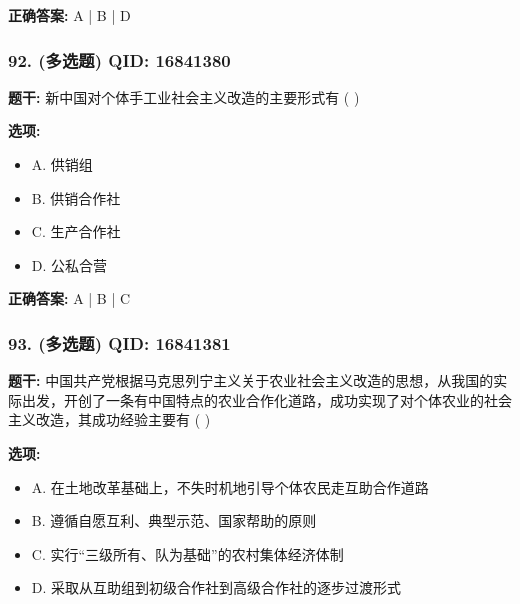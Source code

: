 \documentclass[12pt,UTF8]{ctexart}
\begin{document}
\textbf{正确答案:}
A | B | D

\vspace{0.3em}\hrulefill\vspace{0.7em}

\subsubsection*{92. (多选题) \small QID: 16841380}

\textbf{题干:}
新中国对个体手工业社会主义改造的主要形式有 ( )

\textbf{选项:}
\begin{itemize}[leftmargin=*]

  \item A. 供销组

  \item B. 供销合作社

  \item C. 生产合作社

  \item D. 公私合营

\end{itemize}

\textbf{正确答案:}
A | B | C

\vspace{0.3em}\hrulefill\vspace{0.7em}

\subsubsection*{93. (多选题) \small QID: 16841381}

\textbf{题干:}
中国共产党根据马克思列宁主义关于农业社会主义改造的思想，从我国的实际出发，开创了一条有中国特点的农业合作化道路，成功实现了对个体农业的社会主义改造，其成功经验主要有 ( )

\textbf{选项:}
\begin{itemize}[leftmargin=*]

  \item A. 在土地改革基础上，不失时机地引导个体农民走互助合作道路

  \item B. 遵循自愿互利、典型示范、国家帮助的原则

  \item C. 实行“三级所有、队为基础”的农村集体经济体制

  \item D. 采取从互助组到初级合作社到高级合作社的逐步过渡形式

\end{itemize}
\end{document}
